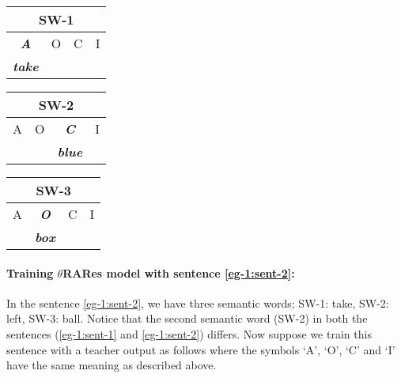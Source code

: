 \begin{table}[H]
\centering
\begin{minipage}{1.5in}
\begin{tabular}{|c|c|c|c|}
\hline
\multicolumn{4}{|c|}{\textbf{SW-1}}   \\ \hline
\textit{\textbf{A}}    & O & C & I     \\ \hline
\textit{\textbf{take}} &   &   &          \\  \hline
\end{tabular}
\end{minipage}
\begin{minipage}{1.5in}
\begin{tabular}{|c|c|c|c|}
\hline
\multicolumn{4}{|c|}{\textbf{SW-2}}                    \\ \hline
A    & O & \textit{\textbf{C}}    & I  \\ \hline
    &   & \textit{\textbf{blue}} &     \\ \hline
\end{tabular}
\end{minipage}
\begin{minipage}{1.5in}
\begin{tabular}{|c|c|c|c|}
\hline
\multicolumn{4}{|c|}{\textbf{SW-3}}                                  \\ \hline
A    & \textit{\textbf{O}}   & C    & I \\ \hline
     & \textit{\textbf{box}} &      &   \\ \hline
\end{tabular}
\end{minipage}
\end{table}

\paragraph{Training $\theta$RARes model with sentence \ref{eg-1:sent-2}:} In the sentence \ref{eg-1:sent-2}, we have three semantic words; SW-1: take, SW-2: left, SW-3: ball. Notice that the second semantic word (SW-2) in both the sentences (\ref{eg-1:sent-1} and \ref{eg-1:sent-2}) differs. Now suppose we train this sentence with a teacher output as follows where the symbols `A', `O', `C' and `I' have the same meaning as described above.

